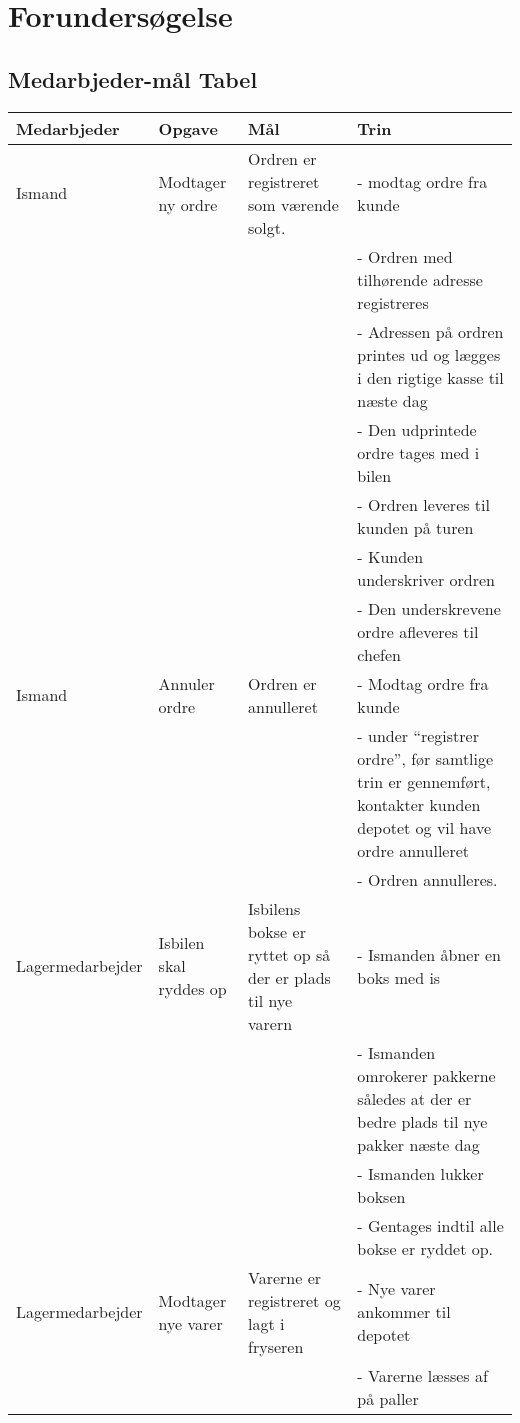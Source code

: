 \section{Forundersøgelse}\label{ch:forundersoegelse}

\subsection{Medarbjeder-mål Tabel}
\begin{center}
\begin{longtable}{ |p{90pt}|p{90pt}|p{90pt}|p{90pt}| }
    \hline
    Medarbjeder & Opgave & Mål & Trin \\
    \hline\hline
    Ismand
    & Modtager ny ordre & Ordren er registreret som værende solgt. &
    - modtag ordre fra kunde \\
    &&&
    - Ordren med tilhørende adresse  registreres \\
    &&&
    - Adressen på ordren printes ud og lægges i den rigtige kasse til næste dag \\
    &&&
    - Den udprintede ordre tages med i bilen \\
    &&&
    - Ordren leveres til kunden på turen \\
    &&&
    - Kunden underskriver ordren \\
    &&&
    - Den underskrevene ordre afleveres til chefen \\
    \hline
    Ismand & Annuler ordre & Ordren er annulleret &
    - Modtag ordre fra kunde \\
    &&&
    - under “registrer ordre”, før samtlige trin er gennemført, kontakter kunden depotet og vil have ordre annulleret \\
    &&&
    - Ordren annulleres. \\
    \hline
    Lagermedarbejder
    & Isbilen skal ryddes op & Isbilens bokse er ryttet op så der er plads til nye varern &
    - Ismanden åbner en boks med is \\
    &&&
    - Ismanden omrokerer pakkerne således at der er bedre plads til nye pakker næste dag \\
    &&&
    - Ismanden lukker boksen \\
    &&&
    - Gentages indtil alle bokse er ryddet op. \\
    \hline
    Lagermedarbejder
    & Modtager nye varer & Varerne er registreret og lagt i fryseren &
    - Nye varer ankommer til depotet \\
    &&&
    - Varerne læsses af på paller \\

\end{longtable}
\end{center}
